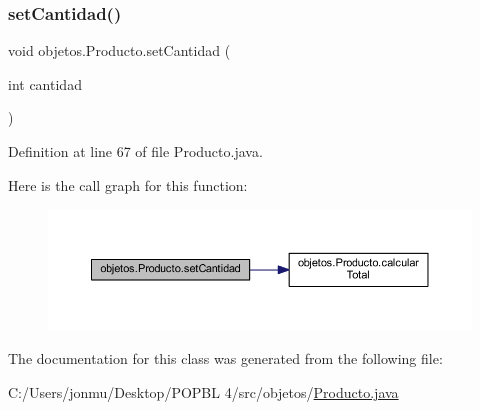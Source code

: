 \subsubsection{\texorpdfstring{set\+Cantidad()}{setCantidad()}}
{\footnotesize\ttfamily void objetos.\+Producto.\+set\+Cantidad (\begin{DoxyParamCaption}\item[{int}]{cantidad }\end{DoxyParamCaption})}



Definition at line 67 of file Producto.\+java.

Here is the call graph for this function\+:
\nopagebreak
\begin{figure}[H]
\begin{center}
\leavevmode
\includegraphics[width=350pt]{classobjetos_1_1_producto_ae14dcc26bdc312a512627177d4e7e442_cgraph}
\end{center}
\end{figure}


The documentation for this class was generated from the following file\+:\begin{DoxyCompactItemize}
\item 
C\+:/\+Users/jonmu/\+Desktop/\+P\+O\+P\+B\+L 4/src/objetos/\mbox{\hyperlink{_producto_8java}{Producto.\+java}}\end{DoxyCompactItemize}
